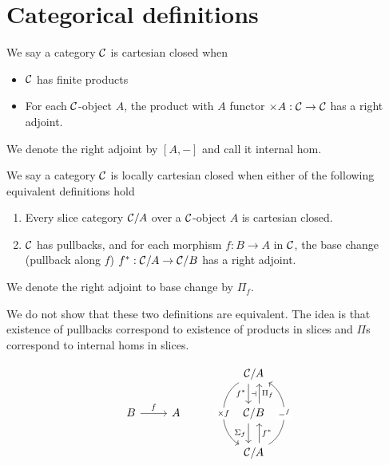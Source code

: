 \section{Categorical definitions}

\begin{dfn}
  We say a category $\mathcal{C}$ is cartesian closed when
  \begin{itemize}
    \item $\mathcal{C}$ has finite products
    \item For each $\mathcal{C}$-object $A$, the product with $A$ functor $\times A : \mathcal{C} \to \mathcal{C}$ has a right adjoint.
  \end{itemize}
  We denote the right adjoint by $[A,-]$ and call it internal hom.
\end{dfn}

\begin{dfn}
  We say a category $\mathcal{C}$ is locally cartesian closed when either of the following equivalent definitions hold
  \begin{enumerate}
    \item Every slice category $\mathcal{C} / A$ over a $\mathcal{C}$-object $A$ is cartesian closed.
    \item $\mathcal{C}$ has pullbacks, and for each morphism $f : B \to A$ in $\mathcal{C}$,
          the base change (pullback along $f$) $f^{*} : \mathcal{C} / A \to \mathcal{C} / B$ has a right adjoint.
  \end{enumerate}
  We denote the right adjoint to base change by $\Pi_{f}$.
\end{dfn}

We do not show that these two definitions are equivalent.
The idea is that existence of pullbacks correspond to existence of products in slices
and $\Pi$s correspond to internal homs in slices.

\[\begin{tikzcd}
	&&& {\CC/A} \\
	B & A && {\CC/B} \\
	&&& {\CC/A}
	\arrow[""{name=0, anchor=center, inner sep=0}, "{f^*}"', shift right=2, from=1-4, to=2-4]
	\arrow[""{name=1, anchor=center, inner sep=0}, "{\Pi_f}"', shift right=2, from=2-4, to=1-4]
	\arrow["{\Si_f}"', shift right=2, from=2-4, to=3-4]
	\arrow["{f^*}"', shift right=2, from=3-4, to=2-4]
	\arrow["{\times f}"{description}, bend left = {- 60}, from=1-4, to=3-4]
	\arrow["{-^f}"{description}, bend left = {- 60}, from=3-4, to=1-4]
	\arrow["f", from=2-1, to=2-2]
	\arrow["\dashv"{anchor=center}, draw=none, from=0, to=1]
\end{tikzcd}\]

